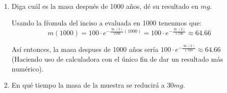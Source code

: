 \documentclass[12pt]{article}
\begin{document}
\begin{enumerate}[\hspace{9px} a)]
    \item Diga cuál es la masa después de 1000 años, dé su resultado en $mg$.\medskip
    
        Usando la f\'romula del inciso a evaluada en 1000 tenenmos que:
        \[m(1000)=100\cdot e^{-\frac{\ln(2)}{1590}(1000)} = 100\cdot e^{-\frac{\ln(2)}{1.590}}\approx64.66\]

        As\'i entonces, la masa despues de 1000 años ser\'ia \(100\cdot e^{-\frac{\ln(2)}{1.590}}\approx64.66\) (Haciendo uso de calculadora con el \'unico fin de dar un resultado m\'as num\'erico).\medskip

    \item En qué tiempo la masa de la muestra se reducirá a $30mg$.

\end{enumerate}
\end{document}
